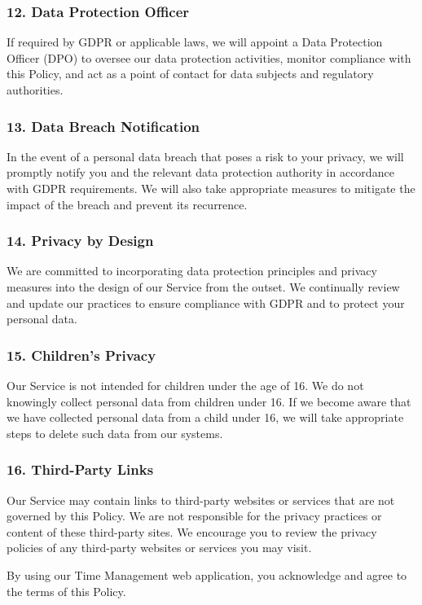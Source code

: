 \documentclass[a4paper]{article}
\begin{document}
\newpage
\begin{tcolorbox}[colback=gray!20, sharp corners, boxrule=0pt, boxsep=0pt, left=5pt, right=5pt, top=5pt, bottom=5pt]
\subsubsection*{12. Data Protection Officer}
If required by GDPR or applicable laws, we will appoint a Data Protection Officer (DPO) to oversee our data protection activities, monitor compliance with this Policy, and act as a point of contact for data subjects and regulatory authorities.

\subsubsection*{13. Data Breach Notification}
In the event of a personal data breach that poses a risk to your privacy, we will promptly notify you and the relevant data protection authority in accordance with GDPR requirements. We will also take appropriate measures to mitigate the impact of the breach and prevent its recurrence.

\subsubsection*{14. Privacy by Design}
We are committed to incorporating data protection principles and privacy measures into the design of our Service from the outset. We continually review and update our practices to ensure compliance with GDPR and to protect your personal data.

\subsubsection*{15. Children's Privacy}
Our Service is not intended for children under the age of 16. We do not knowingly collect personal data from children under 16. If we become aware that we have collected personal data from a child under 16, we will take appropriate steps to delete such data from our systems.

\subsubsection*{16. Third-Party Links}
Our Service may contain links to third-party websites or services that are not governed by this Policy. We are not responsible for the privacy practices or content of these third-party sites. We encourage you to review the privacy policies of any third-party websites or services you may visit.

By using our Time Management web application, you acknowledge and agree to the terms of this Policy.
\end{tcolorbox}
\end{document}
